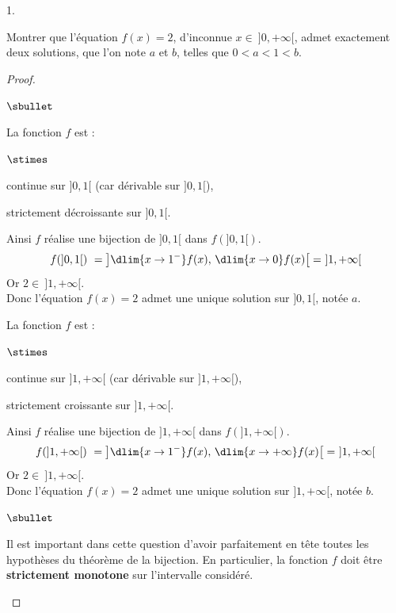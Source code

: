\documentclass[11pt]{article}%
\begin{document}
\begin{noliste}{1.}
  \item Montrer que l'équation $f(x)=2$, d'inconnue $x \in \ 
  ]0,+\infty[$, admet exactement deux solutions, que l'on note $a$ et 
  $b$, telles que $0<a<1<b$.
  
  \begin{proof}~
    \begin{noliste}{$\sbullet$}
      \item La fonction $f$ est : 
      \begin{noliste}{$\stimes$}
	\item continue sur $]0,1[$ (car dérivable sur $]0,1[$),
	\item strictement décroissante sur $]0,1[$.
      \end{noliste}
      Ainsi $f$ réalise une bijection de $]0,1[$ dans $f(]0,1[)$.
      \[
        f(]0,1[) \ = \left] \dlim{x\to 1^-} f(x), \, \dlim{x\to 0}
        f(x) \right[ = \ ]1, + \infty[
      \]
      Or $2 \in \ ]1, +\infty[$.\\
      Donc l'équation $f(x)=2$ admet une unique solution sur $]0,1[$, 
      notée $a$.
      
      
      \newpage
      
      
      \item La fonction $f$ est : 
      \begin{noliste}{$\stimes$}
	\item continue sur $]1,+\infty[$ (car dérivable sur 
	$]1,+\infty[$),
	\item strictement croissante sur $]1,+\infty[$.
      \end{noliste}
      Ainsi $f$ réalise une bijection de $]1,+\infty[$ dans 
      $f(]1,+\infty[)$.
      \[
        f(]1,+\infty[) \ = \left] \dlim{x\to 1^-} f(x), \, \dlim{x\to 
	+\infty} f(x) \right[ = \ ]1, + \infty[
      \]
      Or $2 \in \ ]1, +\infty[$.\\
      Donc l'équation $f(x)=2$ admet une unique solution sur 
      $]1,+\infty[$, notée $b$.
    \end{noliste}
    \conc{Finalement, l'équation $f(x)=2$ admet exactement $2$ 
    solutions sur $]0,+\infty[$ notées $a$ et $b$\\[.1cm]
    telles que 
    $0<a<1<b$.}
    
    \begin{remark}
      \begin{noliste}{$\sbullet$}
	\item Il est important dans cette question d'avoir parfaitement
	en tête toutes les hypothèses du théorème de la bijection. En 
	particulier, la fonction $f$ doit être {\bf strictement 
	monotone} sur l'intervalle considéré.
	

\end{noliste}
\end{remark}
\end{proof}
\end{noliste}
\end{document}
